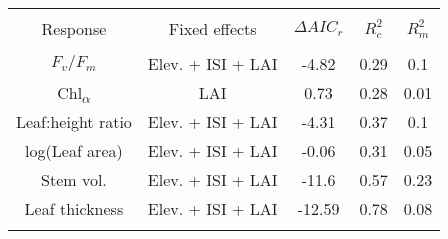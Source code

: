 
\begin{table}[!htbp] \centering 
  \caption{} 
  \label{best_mod_multi_output} 
\begin{tabular}{@{\extracolsep{5pt}} ccccc} 
\\[-1.8ex]\hline 
\hline \\[-1.8ex] 
{Response} & {Fixed effects} & {$\Delta{}AIC_r$} & {$R^2_c$} & {$R^2_m$} \\
\hline \\[-1.8ex] 
$F_v/F_m$ & Elev. + ISI + LAI & -4.82 & 0.29 & 0.1 \\ 
Chl\textsubscript{$\alpha$} & LAI & 0.73 & 0.28 & 0.01 \\ 
Leaf:height ratio & Elev. + ISI + LAI & -4.31 & 0.37 & 0.1 \\ 
log(Leaf area) & Elev. + ISI + LAI & -0.06 & 0.31 & 0.05 \\ 
Stem vol. & Elev. + ISI + LAI & -11.6 & 0.57 & 0.23 \\ 
Leaf thickness & Elev. + ISI + LAI & -12.59 & 0.78 & 0.08 \\ 
\hline \\[-1.8ex] 
\end{tabular} 
\end{table} 
